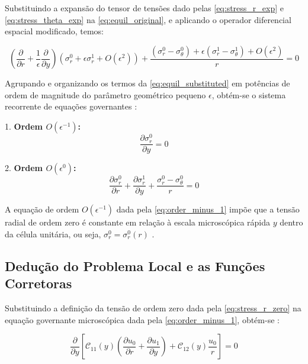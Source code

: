 Substituindo a expansão do tensor de tensões dado pelas \eqref{eq:stress_r_exp} e \eqref{eq:stress_theta_exp} na \eqref{eq:equil_original}, e aplicando o operador diferencial espacial modificado, temos:

\begin{equation}
  \left( \frac{\partial}{\partial r} + \frac{1}{\epsilon} \frac{\partial}{\partial y} \right) (\sigma_r^0 + \epsilon \sigma_r^1 + O(\epsilon^2)) + \frac{(\sigma_r^0 - \sigma_\theta^0) + \epsilon (\sigma_r^1 - \sigma_\theta^1) + O(\epsilon^2)}{r} = 0
  \label{eq:equil_substituted}
\end{equation}

Agrupando e organizando os termos da \eqref{eq:equil_substituted} em potências de ordem de magnitude do parâmetro geométrico pequeno $\epsilon$, obtém-se o sistema recorrente de equações governantes \cite{bakhvalov1989}:

1. \textbf{Ordem $O(\epsilon^{-1})$:}
\begin{equation}
  \frac{\partial \sigma_r^0}{\partial y} = 0
  \label{eq:order_minus_1}
\end{equation}

2. \textbf{Ordem $O(\epsilon^0)$:}
\begin{equation}
  \frac{\partial \sigma_r^0}{\partial r} + \frac{\partial \sigma_r^1}{\partial y} + \frac{\sigma_r^0 - \sigma_\theta^0}{r} = 0
  \label{eq:order_zero}
\end{equation}

A equação de ordem $O(\epsilon^{-1})$ dada pela \eqref{eq:order_minus_1} impõe que a tensão radial de ordem zero é constante em relação à escala microscópica rápida $y$ dentro da célula unitária, ou seja, $\sigma_r^0 = \sigma_r^0 (r)$ \cite{bakhvalov1989}.

\subsection{Dedução do Problema Local e as Funções Corretoras}

Substituindo a definição da tensão de ordem zero dada pela \eqref{eq:stress_r_zero} na equação governante microscópica dada pela \eqref{eq:order_minus_1}, obtém-se \cite{bakhvalov1989}:

\begin{equation}
  \frac{\partial}{\partial y} \left[ \mathcal{C}_{11}(y) \left( \frac{\partial u_0}{\partial r} + \frac{\partial u_1}{\partial y} \right) + \mathcal{C}_{12}(y) \frac{u_0}{r} \right] = 0
  \label{eq:order_minus_1_full}
\end{equation}

